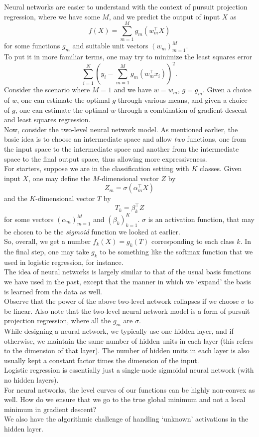 \documentclass{article}
\begin{document}
		Neural networks are easier to understand with the context of pursuit projection regression, where we have some $M$, and we predict the output of input $X$ as
		\[ f(X) = \sum_{m=1}^M g_m(w_m^\top X) \]
		for some functions $g_m$ and suitable unit vectors $(w_m)_{m=1}^M$.\\
		To put it in more familiar terms, one may try to minimize the least squares error
		\[ \sum_{i=1}^N \left( y_i - \sum_{m=1}^M g_m(w_m^\top x_i) \right)^2. \]
		Consider the scenario where $M=1$ and we have $w = w_m$, $g = g_m$. Given a choice of $w$, one can estimate the optimal $g$ through various means, and given a choice of $g$, one can estimate the optimal $w$ through a combination of gradient descent and least squares regression.\\

		Now, consider the two-level neural network model. As mentioned earlier, the basic idea is to choose an intermediate space and allow \emph{two} functions, one from the input space to the intermediate space and another from the intermediate space to the final output space, thus allowing more expressiveness.\\
		For starters, suppose we are in the classification setting with $K$ classes. Given input $X$, one may define the $M$-dimensional vector $Z$ by
		\[ Z_m = \sigma(\alpha_m^\top X) \]
		and the $K$-dimensional vector $T$ by
		\[ T_k = \beta_k^\top Z \]
		for some vectors $(\alpha_m)_{m=1}^M$ and $(\beta_k)_{k=1}^K$. $\sigma$ is an activation function, that may be chosen to be the \emph{sigmoid} function we looked at earlier.\\
		So, overall, we get a number $f_k(X) = g_k(T)$ corresponding to each class $k$. In the final step, one may take $g_k$ to be something like the softmax function that we used in logistic regression, for instance.\\
		The idea of neural networks is largely similar to that of the usual basis functions we have used in the past, except that the manner in which we `expand' the basis is learned from the data as well.\\
		Observe that the power of the above two-level network collapses if we choose $\sigma$ to be linear.	Also note that the two-level neural network model is a form of pursuit projection regression, where all the $g_m$ are $\sigma$. \\

		While designing a neural network, we typically use one hidden layer, and if otherwise, we maintain the same number of hidden units in each layer (this refers to the dimension of that layer). The number of hidden units in each layer is also usually kept a constant factor times the dimension of the input.\\
		Logistic regression is essentially just a single-node sigmoidal neural network (with no hidden layers).\\
		For neural networks, the level curves of our functions can be highly non-convex as well. How do we ensure that we go to the true global minimum and not a local minimum in gradient descent? \\
		We also have the algorithmic challenge of handling `unknown' activations in the hidden layer.\\
\end{document}
